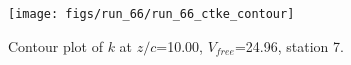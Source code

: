 \begin{figure}[H]
\centering
\texttt{[image: figs/run\_66/run\_66\_ctke\_contour]}
\caption{Contour plot of $k$ at $z/c$=10.00, $V_{free}$=24.96, station 7.}
\label{fig:run_66_ctke_contour}
\end{figure}


